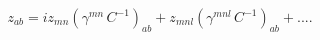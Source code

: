 \begin{equation}\label{2}
z_{ab}=iz_{mn}(\gamma^{mn}\,C^{-1})_{ab}+z_{mnl}(\gamma^{mnl}\,C^{-1})_{ab}+....
\end{equation} 
